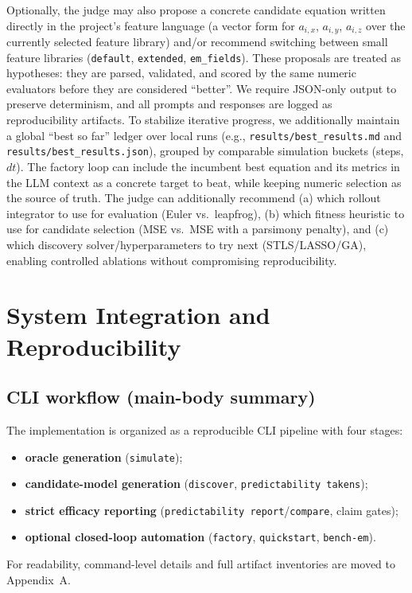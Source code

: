 \documentclass[11pt]{article}
\begin{document}
Optionally, the judge may also propose a concrete candidate equation written directly in the project’s feature language (a vector form for $a_{i,x}$, $a_{i,y}$, $a_{i,z}$ over the currently selected feature library) and/or recommend switching between small feature libraries (\texttt{default}, \texttt{extended}, \texttt{em\_fields}). These proposals are treated as hypotheses: they are parsed, validated, and scored by the same numeric evaluators before they are considered ``better''. We require JSON-only output to preserve determinism, and all prompts and responses are logged as reproducibility artifacts.
To stabilize iterative progress, we additionally maintain a global ``best so far'' ledger over local runs (e.g., \texttt{results/best\_results.md} and \texttt{results/best\_results.json}), grouped by comparable simulation buckets (steps, $dt$). The factory loop can include the incumbent best equation and its metrics in the LLM context as a concrete target to beat, while keeping numeric selection as the source of truth.
The judge can additionally recommend (a) which rollout integrator to use for evaluation (Euler vs.\ leapfrog), (b) which fitness heuristic to use for candidate selection (MSE vs.\ MSE with a parsimony penalty), and (c) which discovery solver/hyperparameters to try next (STLS/LASSO/GA), enabling controlled ablations without compromising reproducibility.

\section{System Integration and Reproducibility}
\subsection{CLI workflow (main-body summary)}
The implementation is organized as a reproducible CLI pipeline with four stages:
\begin{itemize}
\item \textbf{oracle generation} (\texttt{simulate});
\item \textbf{candidate-model generation} (\texttt{discover}, \texttt{predictability takens});
\item \textbf{strict efficacy reporting} (\texttt{predictability report}/\texttt{compare}, claim gates);
\item \textbf{optional closed-loop automation} (\texttt{factory}, \texttt{quickstart}, \texttt{bench-em}).
\end{itemize}
For readability, command-level details and full artifact inventories are moved to Appendix~A.
\end{document}
